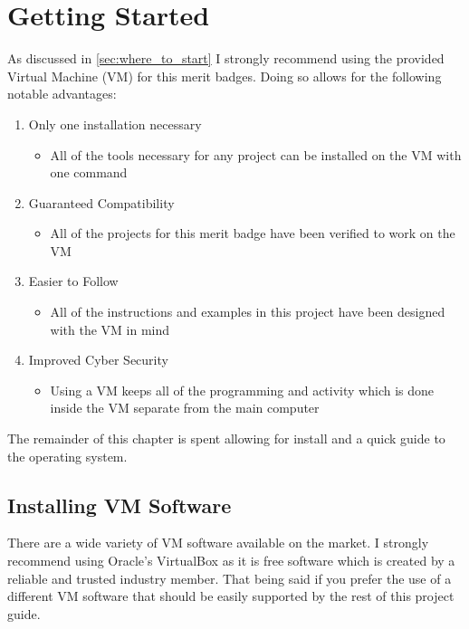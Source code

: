 \graphicspath{ {images/VM_Install} {images/Ubuntu_Intro} }

\chapter{Getting Started}
\label{chap:getting_started}

  As discussed in \autoref{sec:where_to_start} I strongly recommend using the provided
    Virtual Machine (VM) for this merit badges.
  Doing so allows for the following notable advantages:

  \begin{enumerate}
    \item Only one installation necessary
    \begin{itemize}
      \item All of the tools necessary for any project can be installed on the VM with one command
    \end{itemize}
    \item Guaranteed Compatibility
    \begin{itemize}
      \item All of the projects for this merit badge have been verified to work on the VM
    \end{itemize}
    \item Easier to Follow
    \begin{itemize}
      \item All of the instructions and examples in this project have been designed with the VM in mind
    \end{itemize}
    \item Improved Cyber Security
    \begin{itemize}
      \item Using a VM keeps all of the programming and activity which is done inside the VM separate from the main computer
    \end{itemize}
  \end{enumerate}

  The remainder of this chapter is spent allowing for install and a quick guide to the operating system.

  \section{Installing VM Software}
  \label{sec:installing_vm_software}

    There are a wide variety of VM software available on the market.
    I strongly recommend using Oracle's VirtualBox as it is free software which is created by a 
      reliable and trusted industry member.
    That being said if you prefer the use of a different VM software that should be easily supported
      by the rest of this project guide.

